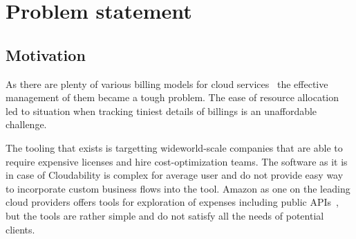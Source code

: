 \documentclass[licencjacka,en]{thesisclass}
\begin{document}

\chapter{Problem statement}

    \section{Motivation}

        As there are plenty of various billing models for cloud services~\cite{GLaatikainen}
        the effective management of them became a tough problem.
        The ease of resource allocation led to situation when tracking tiniest details of billings is an unaffordable challenge.

        The tooling that exists is targetting wideworld-scale companies that are able to require expensive licenses and hire cost-optimization teams.
        The software as it is in case of Cloudability is complex for average user and do not provide easy way to incorporate custom business flows into the tool.
        Amazon as one on the leading cloud providers offers tools for exploration of expenses including public APIs~\cite{AWSCostManagement},
        but the tools are rather simple and do not satisfy all the needs of potential clients.
\end{document}
